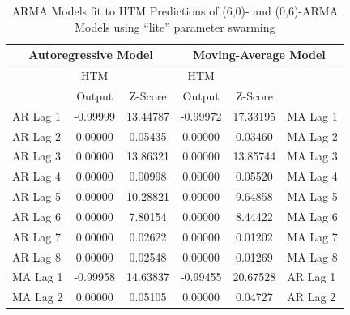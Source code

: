 \documentclass[oneside,12pt,openany]{book}
\begin{document}
    
    \begin{table}[hbt!]
        \centering
        \begin{tabular}{|l|c|c|c|c|l|}
            \hline
            \multicolumn{3}{|c|}{Autoregressive Model} & \multicolumn{3}{c|}{Moving-Average Model} \\ \hline
            \cellcolor{black} & HTM & & HTM &  & \cellcolor{black} \\
            \cellcolor{black} & Output & Z-Score & Output & Z-Score & \cellcolor{black} \\ \hline
            AR Lag 1 & -0.99999 & 13.44787 & -0.99972 & 17.33195 & MA Lag 1 \\ \hline
            AR Lag 2 & 0.00000 & 0.05435 & 0.00000 & 0.03460 & MA Lag 2 \\ \hline
            AR Lag 3 & 0.00000 & 13.86321 & 0.00000 & 13.85744 & MA Lag 3 \\ \hline
            AR Lag 4 & 0.00000 & 0.00998 & 0.00000 & 0.05520 & MA Lag 4 \\ \hline
            AR Lag 5 & 0.00000 & 10.28821 & 0.00000 & 9.64858 & MA Lag 5 \\ \hline
            AR Lag 6 & 0.00000 & 7.80154 & 0.00000 & 8.44422 & MA Lag 6 \\ \hline
            AR Lag 7 & 0.00000 & 0.02622 & 0.00000 & 0.01202 & MA Lag 7 \\ \hline
            AR Lag 8 & 0.00000 & 0.02548 & 0.00000 & 0.01269 & MA Lag 8 \\ \hline
            MA Lag 1 & -0.99958 & 14.63837 & -0.99455 & 20.67528 & AR Lag 1 \\ \hline
            MA Lag 2 & 0.00000 & 0.05105 & 0.00000 & 0.04727 & AR Lag 2 \\ \hline
        \end{tabular}
        \caption{ARMA Models fit to HTM Predictions of (6,0)- and (0,6)-ARMA Models using ``lite'' parameter swarming}
        \label{tab:HTMARMAError6Lite}
    \end{table}
		
\end{document}

